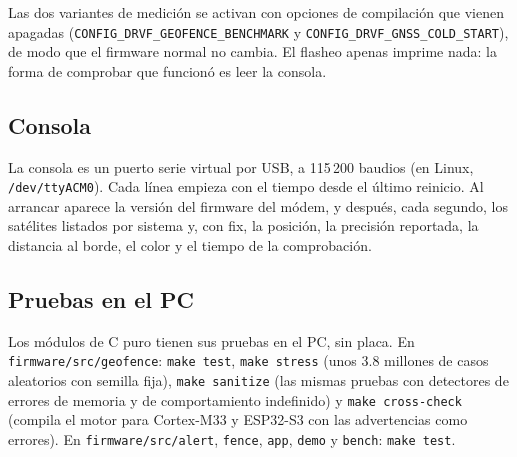 Las dos variantes de medición se activan con opciones de compilación que vienen apagadas
(\texttt{CONFIG\_DRVF\_\allowbreak GEOFENCE\_\allowbreak BENCHMARK} y \texttt{CONFIG\_DRVF\_\allowbreak GNSS\_\allowbreak COLD\_\allowbreak START}), de modo
que el firmware normal no cambia. El flasheo apenas imprime nada: la forma de comprobar que
funcionó es leer la consola.

\subsection{Consola}

La consola es un puerto serie virtual por USB, a 115\,200 baudios (en Linux, \texttt{/dev/ttyACM0}).
Cada línea empieza con el tiempo desde el último reinicio. Al arrancar aparece la versión del
firmware del módem, y después, cada segundo, los satélites listados por sistema y, con fix, la
posición, la precisión reportada, la distancia al borde, el color y el tiempo de la comprobación.

\subsection{Pruebas en el PC}

Los módulos de C puro tienen sus pruebas en el PC, sin placa. En \texttt{firmware/src/geofence}:
\texttt{make test}, \texttt{make stress} (unos 3.8 millones de casos aleatorios con semilla fija),
\texttt{make sanitize} (las mismas pruebas con detectores de errores de memoria y de comportamiento
indefinido) y \texttt{make cross-check} (compila el motor para Cortex-M33 y ESP32-S3 con las
advertencias como errores). En \texttt{firmware/src/alert}, \texttt{fence}, \texttt{app}, \texttt{demo}
y \texttt{bench}: \texttt{make test}.
